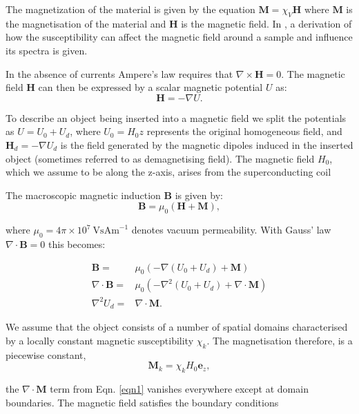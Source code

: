 The magnetization of the material is given by the equation $\mathbf{M} = \chi_V \mathbf{H}$
where $\mathbf{M}$ is the magnetisation of the material and $\mathbf{H}$ is the magnetic field. In
\citep{RN118}, a derivation of how the susceptibility can affect the magnetic field around a sample
and influence its spectra is given.

In the absence of currents Ampere’s law requires that $\nabla \times \mathbf{H} = 0$. The magnetic field $\mathbf{H}$
can then be expressed by a scalar magnetic potential $U$ as:
\begin{equation}
\mathbf{H} = -\nabla U.
\end{equation}

To describe an object being inserted into a magnetic field we split the potentials as $U = U_{0}  + U_{d}$, where $U_{0} = H_{0}z$ represents the original homogeneous field, and
$\mathbf{H}_d = - \nabla U_{d}$ is the field generated by the magnetic dipoles induced in the inserted object (sometimes referred to as demagnetising field). The magnetic field $H_{0}$, which we assume to be along the z-axis, arises from the superconducting coil

 The macroscopic magnetic induction $\mathbf{B}$ is given by:
\begin{equation}
  \mathbf{B} = \mu_{0}(\mathbf{H}+\mathbf{M}),
\end{equation}

where $\mu_{0} = 4\pi\times10^{7}~\text{VsAm}^{-1}$ denotes vacuum permeability. With Gauss' law $\nabla \cdot \mathbf{B} = 0$ this becomes:

\begin{align}\label{eqn1}
  \mathbf{B} =& \mu_0(-\nabla(U_0 + U_d) + \mathbf{M})\\
  \nabla\cdot\mathbf{B} =& \mu_0(-\nabla^{2}(U_0 + U_d) + \nabla\cdot\mathbf{M})\\
  \nabla^{2}U_{d} =& \nabla \cdot \mathbf{M}.
\end{align}

We assume that the object consists of a number of spatial domains characterised by a
locally constant magnetic susceptibility $\chi_{k}$. The magnetisation therefore, is a piecewise
constant,
\begin{equation}
  \mathbf{M}_{k} = \chi_{k}H_{0}\mathbf{e}_{z},
\end{equation}

the $\nabla\cdot\mathbf{M}$ term from Eqn. \ref{eqn1} vanishes everywhere except at domain boundaries. The magnetic
field satisfies the boundary conditions\citep{Jackson:2007uq}

